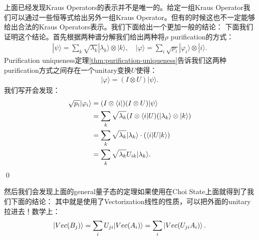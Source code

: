 上面已经发现Kraus Operators的表示并不是唯一的。给定一组Kraus Operator我们可以通过一些恒等式给出另外一组Kraus Operator。但有的时候这也不一定能够给出合法的Kraus Operators表示。我们下面给出一个更加一般的结论：
下面我们证明这个结论。首先根据两种谱分解我们给出两种将$ \rho $ purification的方式：
\begin{align}
  |\psi\rangle=\sum_k\sqrt{\lambda_k}|\lambda_k\rangle\otimes|k\rangle,\quad|\varphi\rangle=\sum_i\sqrt{p_i}|\varphi_i\rangle\otimes|i\rangle.
\end{align}
Purification uniqueness定理\cref{thm:purification-uniqueness}告诉我们这两种purification方式之间存在一个unitary变换$ U $使得：
\begin{align}
  |\varphi\rangle=(I\otimes U)|\psi\rangle.
\end{align}
我们写开会发现：
\begin{align}
  \begin{aligned}\sqrt{p_i}|\varphi_i\rangle&\large=(I\otimes\langle i|)(I\otimes U)|\psi\rangle\\&=\sum_k\sqrt{\lambda_k}(I\otimes\langle i|U)(|\lambda_k\rangle\otimes|k\rangle)\\&=\sum_k\sqrt{\lambda_k}|\lambda_k\rangle\cdot(\langle i|U|k\rangle)\\&=\sum_k\sqrt{\lambda_k}U_{ik}|\lambda_k\rangle.\end{aligned}
\end{align}
\qed 


然后我们会发现上面的general量子态的定理如果使用在Choi State上面就得到了我们下面的结论：
其中就是使用了Vectorization线性的性质，可以把外面的unitary拉进去！数学上：
\begin{align}
  |Vec(B_j)\rangle = \sum_i U_{ji} |Vec(A_i)\rangle = \sum_i \left| Vec(U_{ji} A_i) \right\rangle.
\end{align}



